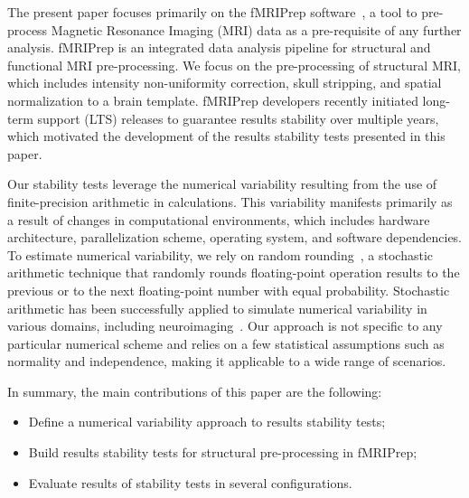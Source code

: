 \documentclass[lettersize,journal]{IEEEtran}
\newcommand{\fmriprep}{fMRIPrep\xspace}
\begin{document}
The present paper focuses primarily on the \fmriprep software~\cite{esteban2019fmriprep}, a tool to pre-process Magnetic Resonance Imaging (MRI) data as a pre-requisite of any further analysis. \fmriprep is an integrated data analysis pipeline for structural and functional MRI pre-processing. We focus on the pre-processing of structural MRI, which includes intensity non-uniformity correction, skull stripping, and spatial normalization to a brain template.
\fmriprep developers recently initiated long-term support (LTS) releases to guarantee results stability over multiple years, which motivated the development of the results stability tests presented in this paper.


Our stability tests leverage the numerical variability resulting from the use of finite-precision arithmetic in calculations. This variability manifests primarily as a result of changes in computational environments, which includes hardware architecture, parallelization scheme, operating system, and software dependencies. To estimate numerical variability, we rely on random rounding~\cite{forsythe1959reprint}, a stochastic arithmetic technique that randomly rounds floating-point operation results to the previous or to the next floating-point number with equal probability. Stochastic arithmetic has been successfully applied to simulate numerical variability in various domains, including neuroimaging~\cite{salari2021accurate, kiar2021numerical}. Our approach is not specific to any particular numerical scheme and relies on a few statistical assumptions such as normality and independence, making it applicable to a wide range of scenarios.

In summary, the main contributions of this paper are the following:
\begin{itemize}
  \item Define a numerical variability approach to results stability tests;
  \item Build results stability tests for structural pre-processing in \fmriprep;
  \item Evaluate results of stability tests in several configurations.
\end{itemize}
\end{document}
